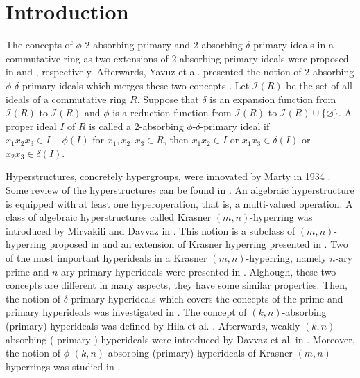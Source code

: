 \documentclass[preprint,review,10pt]{amsart}
\theoremstyle{definition}
\theoremstyle{remark}
\numberwithin{equation}{section}
\begin{document}
\section{Introduction}
The concepts of  $\phi$-2-absorbing primary and 2-absorbing $\delta$-primary ideals in a commutative ring as two extensions of 2-absorbing primary ideals were proposed in \cite{bada} and \cite{bmb3}, respectively. Afterwards, Yavuz et al. presented the notion of 2-absorbing $\phi$-$\delta$-primary ideals  which merges these two  concepts \cite{Yavuz}. Let $\mathcal{I}(R)$ be  the set of all ideals of   a commutative ring $R$. Suppose that $\delta$ is an expansion  function from $ \mathcal{I}(R)$ to $\mathcal{I}(R)$ and $\phi$ is a reduction  function from $ \mathcal{I}(R)$ to $\mathcal{I}(R) \cup \{\varnothing\}$. A  proper ideal $I$ 
of $R$ is called a 2-absorbing $\phi$-$\delta$-primary ideal if   $x_1x_2x_3 \in I-\phi(I)$ for $x_1,x_2,x_3 \in R$, then  $x_1x_2 \in I$ or $x_1x_3 \in \delta(I)$ or $x_2x_3 \in \delta(I)$. 




Hyperstructures, concretely hypergroups, were innovated  by
Marty in 1934 \cite{s1}.  Some review of the hyperstructures  can be found in  \cite{amer2, s2, s3,  davvaz1, s6, s5,s1, davvaz2, s4, s10, jian}. An algebraic hyperstructure is equipped with at least one  hyperoperation, that is, a multi-valued operation. A class of
algebraic hyperstructures called Krasner $(m,n)$-hyperring was introduced by Mirvakili and Davvaz in \cite{d1}. This notion is a subclass of $(m,n)$-hyperring proposed in \cite{cons} and an extension of Krasner hyperring presented in \cite{Krasner}. 
 Two  of the most important
hyperideals  in a  Krasner $(m, n)$-hyperring, namely   $n$-ary prime and $n$-ary primary hyperideals  were presented   in \cite{sorc1}.  Alghough, these two concepts are different in many
aspects, they have some similar properties. Then, the notion of $\delta$-primary  hyperideals  which covers the concepts of the prime and primary hyperideals  was investigated in \cite{mah3}. The concept of $(k,n)$-absorbing (primary) hyperideals  was defined by Hila et al. \cite{rev2}. 
Afterwards, weakly $(k,n)$-absorbing  ( primary ) hyperideals were introduced by Davvaz et al.  in \cite{weak}. Moreover, the notion of $\phi$-$(k,n)$-absorbing (primary) hyperideals of  Krasner $(m,n)$-hyperrings was studied in \cite{mah6}. 
\end{document}
